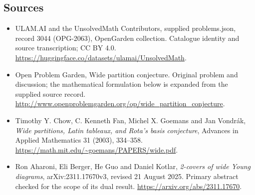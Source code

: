 \documentclass[11pt,a4paper]{article}
\begin{document}
\subsection{Sources}
\begin{itemize}
\item[S1] ULAM.AI and the UnsolvedMath Contributors, supplied problems.json, record 3044 (OPG-2063), OpenGarden collection. Catalogue identity and source transcription; CC BY 4.0.
\url{https://huggingface.co/datasets/ulamai/UnsolvedMath}.
\item[S2] Open Problem Garden, Wide partition conjecture. Original problem and discussion; the mathematical formulation below is expanded from the supplied source record.
\url{http://www.openproblemgarden.org/op/wide_partition_conjecture}.

\item[R1] Timothy Y. Chow, C. Kenneth Fan, Michel X. Goemans and
Jan Vondr\'ak, \emph{Wide partitions, Latin tableaux, and Rota's basis
conjecture}, Advances in Applied Mathematics 31 (2003), 334--358.
\url{https://math.mit.edu/~goemans/PAPERS/wide.pdf}.
\item[R2] Ron Aharoni, Eli Berger, He Guo and Daniel Kotlar,
\emph{2-covers of wide Young diagrams}, arXiv:2311.17670v3,
revised 21 August 2025. Primary abstract checked for the scope of its
dual result.
\url{https://arxiv.org/abs/2311.17670}.

\end{itemize}
\end{document}
